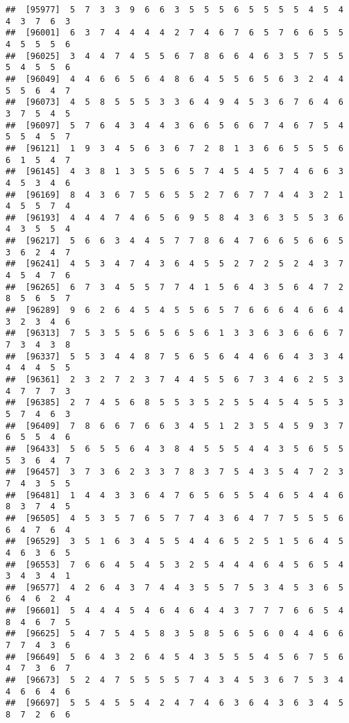 \documentclass[
]{book}
\begin{document}
\begin{verbatim}
##  [95977]  5  7  3  3  9  6  6  3  5  5  5  6  5  5  5  5  4  5  4  4  3  7  6  3
##  [96001]  6  3  7  4  4  4  4  2  7  4  6  7  6  5  7  6  6  5  5  4  5  5  5  6
##  [96025]  3  4  4  7  4  5  5  6  7  8  6  6  4  6  3  5  7  5  5  5  4  5  5  6
##  [96049]  4  4  6  6  5  6  4  8  6  4  5  5  6  5  6  3  2  4  4  5  5  6  4  7
##  [96073]  4  5  8  5  5  5  3  3  6  4  9  4  5  3  6  7  6  4  6  3  7  5  4  5
##  [96097]  5  7  6  4  3  4  4  3  6  6  5  6  6  7  4  6  7  5  4  5  5  4  5  7
##  [96121]  1  9  3  4  5  6  3  6  7  2  8  1  3  6  6  5  5  5  6  6  1  5  4  7
##  [96145]  4  3  8  1  3  5  5  6  5  7  4  5  4  5  7  4  6  6  3  4  5  3  4  6
##  [96169]  8  4  3  6  7  5  6  5  5  2  7  6  7  7  4  4  3  2  1  4  5  5  7  4
##  [96193]  4  4  4  7  4  6  5  6  9  5  8  4  3  6  3  5  5  3  6  4  3  5  5  4
##  [96217]  5  6  6  3  4  4  5  7  7  8  6  4  7  6  6  5  6  6  5  3  6  2  4  7
##  [96241]  4  5  3  4  7  4  3  6  4  5  5  2  7  2  5  2  4  3  7  4  5  4  7  6
##  [96265]  6  7  3  4  5  5  7  7  4  1  5  6  4  3  5  6  4  7  2  8  5  6  5  7
##  [96289]  9  6  2  6  4  5  4  5  5  6  5  7  6  6  6  4  6  6  4  3  2  3  4  6
##  [96313]  7  5  3  5  5  6  5  6  5  6  1  3  3  6  3  6  6  6  7  7  3  4  3  8
##  [96337]  5  5  3  4  4  8  7  5  6  5  6  4  4  6  6  4  3  3  4  4  4  4  5  5
##  [96361]  2  3  2  7  2  3  7  4  4  5  5  6  7  3  4  6  2  5  3  4  7  7  7  3
##  [96385]  2  7  4  5  6  8  5  5  3  5  2  5  5  4  5  4  5  5  3  5  7  4  6  3
##  [96409]  7  8  6  6  7  6  6  3  4  5  1  2  3  5  4  5  9  3  7  6  5  5  4  6
##  [96433]  5  6  5  5  6  4  3  8  4  5  5  5  4  4  3  5  6  5  5  5  3  6  4  7
##  [96457]  3  7  3  6  2  3  3  7  8  3  7  5  4  3  5  4  7  2  3  7  4  3  5  5
##  [96481]  1  4  4  3  3  6  4  7  6  5  6  5  5  4  6  5  4  4  6  8  3  7  4  5
##  [96505]  4  5  3  5  7  6  5  7  7  4  3  6  4  7  7  5  5  5  6  6  4  7  6  4
##  [96529]  3  5  1  6  3  4  5  5  4  4  6  5  2  5  1  5  6  4  5  4  6  3  6  5
##  [96553]  7  6  6  4  5  4  5  3  2  5  4  4  4  6  4  5  6  5  4  3  4  3  4  1
##  [96577]  4  2  6  4  3  7  4  4  3  5  5  7  5  3  4  5  3  6  5  6  4  6  2  4
##  [96601]  5  4  4  4  5  4  6  4  6  4  4  3  7  7  7  6  6  5  4  8  4  6  7  5
##  [96625]  5  4  7  5  4  5  8  3  5  8  5  6  5  6  0  4  4  6  6  7  7  4  3  6
##  [96649]  5  6  4  3  2  6  4  5  4  3  5  5  5  4  5  6  7  5  6  4  7  3  6  7
##  [96673]  5  2  4  7  5  5  5  5  7  4  3  4  5  3  6  7  5  3  4  4  6  6  4  6
##  [96697]  5  5  4  5  5  4  2  4  7  4  6  3  6  4  3  6  3  4  5  8  7  2  6  6

\end{verbatim}
\end{document}
